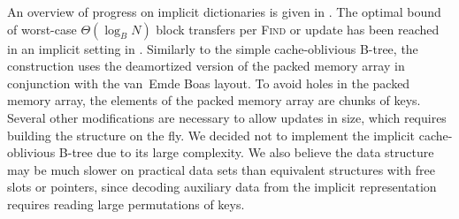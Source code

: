 An overview of progress on implicit dictionaries is given in
\cite{implicit-btrees-survey}. The optimal bound of worst-case
$\Theta(\log_B N)$ block transfers per \textsc{Find} or update has been reached
in an implicit setting in \cite{implicit-cob}. Similarly to the simple
cache-oblivious \mbox{B-tree}, the construction uses the deamortized version of
the packed memory array in conjunction with the van~Emde Boas layout. To avoid
holes in the packed memory array, the elements of the packed memory array are
chunks of keys.  Several other modifications are necessary to allow updates
in size, which requires building the structure on the fly.
We decided not to implement the implicit cache-oblivious B-tree due
to its large complexity. We also believe the data structure may be much
slower on practical data sets than equivalent structures with free slots or
pointers, since decoding auxiliary data from the implicit representation
requires reading large permutations of keys.
